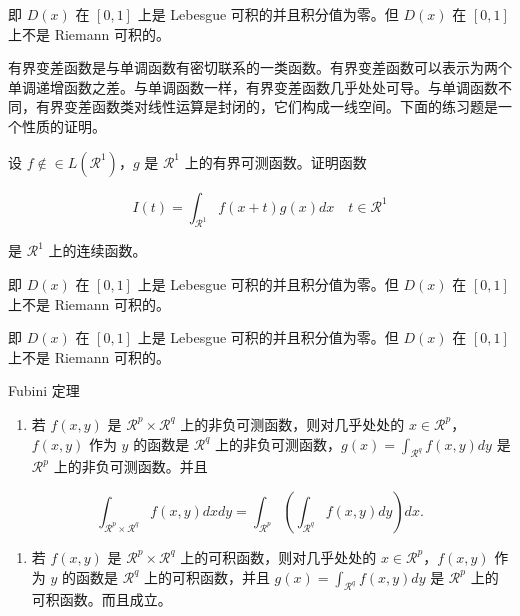 \documentclass[cn,11pt,fancy,hide]{elegantbook}
\providecommand{\tightlist}{%
  \setlength{\itemsep}{0pt}\setlength{\parskip}{0pt}}
\begin{document}
即 \(D(x)\) 在 \([0,1]\) 上是 Lebesgue 可积的并且积分值为零。但 \(D(x)\) 在 \([0,1]\) 上不是 Riemann 可积的。

有界变差函数是与单调函数有密切联系的一类函数。有界变差函数可以表示为两个单调递增函数之差。与单调函数一样，有界变差函数几乎处处可导。与单调函数不同，有界变差函数类对线性运算是封闭的，它们构成一线空间。下面的练习题是一个性质的证明。

\begin{shaded}

设 \(f \notin\in L(\mathcal{R}^1)\)，\(g\) 是 \(\mathcal{R}^1\) 上的有界可测函数。证明函数

\begin{equation}
   \label{ex:1}
   I(t) = \int_{\mathcal{R}^1} f(x+t)g(x)dx \quad t \in \mathcal{R}^1
\end{equation}

是 \(\mathcal{R}^1\) 上的连续函数。

\end{shaded}

\begin{shaded}

即 \(D(x)\) 在 \([0,1]\) 上是 Lebesgue 可积的并且积分值为零。但 \(D(x)\) 在 \([0,1]\) 上不是 Riemann 可积的。

\end{shaded}

\begin{shaded}

即 \(D(x)\) 在 \([0,1]\) 上是 Lebesgue 可积的并且积分值为零。但 \(D(x)\) 在 \([0,1]\) 上不是 Riemann 可积的。

\end{shaded}

\begin{shaded}

Fubini 定理

\begin{enumerate}
\def\labelenumi{\arabic{enumi}.}
\tightlist
\item
  若 \(f(x,y)\) 是 \(\mathcal{R}^p\times\mathcal{R}^q\) 上的非负可测函数，则对几乎处处的 \(x\in \mathcal{R}^p\)，\(f(x,y)\) 作为 \(y\) 的函数是 \(\mathcal{R}^q\) 上的非负可测函数，\(g(x)=\int_{\mathcal{R}^q}f(x,y) dy\) 是 \(\mathcal{R}^p\) 上的非负可测函数。并且
\end{enumerate}

\begin{equation}
     \int_{\mathcal{R}^p\times\mathcal{R}^q} f(x,y) dxdy=\int_{\mathcal{R}^p}\left(\int_{\mathcal{R}^q}f(x,y)dy\right)dx.
  \end{equation}

\begin{enumerate}
\def\labelenumi{\arabic{enumi}.}
\tightlist
\item
  若 \(f(x,y)\) 是 \(\mathcal{R}^p\times\mathcal{R}^q\) 上的可积函数，则对几乎处处的 \(x\in\mathcal{R}^p\)，\(f(x,y)\) 作为 \(y\) 的函数是 \(\mathcal{R}^q\) 上的可积函数，并且 \(g(x)=\int_{\mathcal{R}^q}f(x,y) dy\) 是 \(\mathcal{R}^p\) 上的可积函数。而且成立。
\end{enumerate}

\end{shaded}
\end{document}
